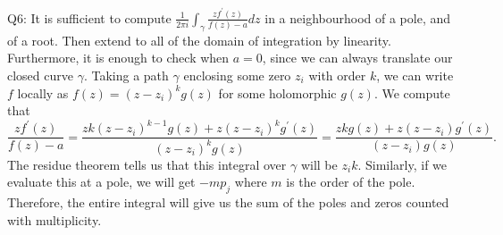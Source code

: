 \documentclass[letterpaper]{article}
\begin{document}
 \noindent Q6: It is sufficient to compute $\frac{1}{2\pi i}\int_\gamma \frac{zf^\prime(z)}{f(z)-a}dz$ in a neighbourhood of a pole, and of a root. Then extend to all of the domain of integration by linearity. Furthermore, it is enough to check when $a=0$, since we can always translate our closed curve $\gamma$. 
Taking a path $\gamma$ enclosing some zero $z_i$ with order $k$, we can write $f$ locally as $f(z) = (z-z_i)^k g(z)$ for some holomorphic $g(z)$. We compute that $$\frac{zf^\prime(z)}{f(z)-a} = \frac{zk(z-z_i)^{k-1}g(z) + z(z-z_i)^kg^\prime(z)}{(z-z_i)^kg(z)} = \frac{zkg(z) + z(z-z_i)g^\prime(z)}{(z-z_i)g(z)}.$$
The residue theorem tells us that this integral over $\gamma$ will be $z_ik$. Similarly, if we evaluate this at a pole, we will get $-mp_j$ where $m$ is the order of the pole. Therefore, the entire integral will give us the sum of the poles and zeros counted with multiplicity.
\end{document}
